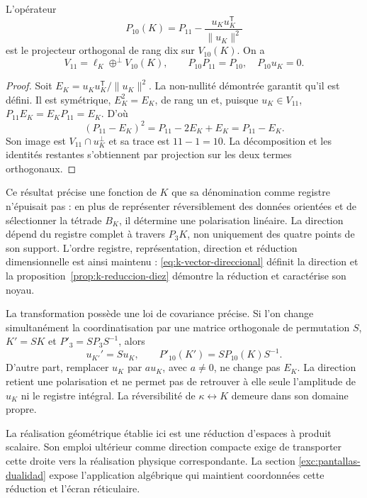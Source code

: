 \begin{proposition}
\label{prop:k-reduccion-diez}
L'opérateur
\begin{equation}
 P_{10}(K)=P_{11}
       -\frac{u_Ku_K^{\mathsf T}}{\lVert u_K\rVert^2}
 \label{eq:k-proyector-diez}
\end{equation}
est le projecteur orthogonal de rang dix sur \(V_{10}(K)\). On a
\[
 V_{11}=\ell_K\mathbin{\oplus^{\perp}}V_{10}(K),
 \qquad P_{10}P_{11}=P_{10},\quad P_{10}u_K=0.
\]
\end{proposition}
\begin{proof}
Soit \(E_K=u_Ku_K^{\mathsf T}/\lVert u_K\rVert^2\). La non-nullité démontrée garantit qu'il est défini. Il est symétrique, \(E_K^2=E_K\), de rang un et, puisque \(u_K\in V_{11}\), \(P_{11}E_K=E_KP_{11}=E_K\). D'où
\[
 (P_{11}-E_K)^2=P_{11}-2E_K+E_K=P_{11}-E_K.
\]
Son image est \(V_{11}\cap u_K^\perp\) et sa trace est
\(11-1=10\). La décomposition et les identités restantes
s'obtiennent par projection sur les deux termes orthogonaux.
\end{proof}

Ce résultat précise une fonction de \(K\) que sa dénomination comme
registre n’épuisait pas : en plus de représenter réversiblement des données
orientées et de sélectionner la tétrade \(B_K\), il détermine une
polarisation linéaire. La direction dépend du registre complet à
travers \(P_3K\), non uniquement des quatre points de son support.
L’ordre registre, représentation, direction et
réduction dimensionnelle est ainsi maintenu : \eqref{eq:k-vector-direccional} définit la
direction et la proposition~\ref{prop:k-reduccion-diez} démontre
la réduction et caractérise son noyau.

La transformation possède une loi de covariance précise. Si l'on change
simultanément la coordinatisation par une matrice orthogonale de permutation \(S\),
\(K'=SK\) et \(P'_3=SP_3S^{-1}\), alors
\[
 u_{K'}'=Su_K,\qquad P'_{10}(K')=SP_{10}(K)S^{-1}.
\]
D'autre part, remplacer \(u_K\) par \(a u_K\), avec \(a\ne0\),
ne change pas \(E_K\). La direction retient une polarisation et ne
permet pas de retrouver à elle seule l'amplitude de \(u_K\) ni le
registre intégral. La réversibilité de \(\kappa\leftrightarrow K\)
demeure dans son domaine propre.

La réalisation géométrique établie ici est une réduction d'espaces à produit scalaire. Son emploi ultérieur comme direction compacte exige de transporter cette droite vers la réalisation physique correspondante. La section \ref{exc:pantallas-dualidad} expose l'application algébrique qui maintient coordonnées cette réduction et l'écran réticulaire.
